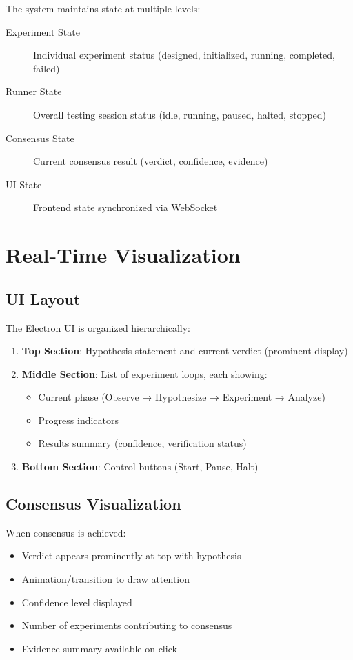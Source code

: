 \documentclass{book}
\begin{document}
The system maintains state at multiple levels:

\begin{description}
    \item[Experiment State] Individual experiment status (designed, initialized, running, completed, failed)
    \item[Runner State] Overall testing session status (idle, running, paused, halted, stopped)
    \item[Consensus State] Current consensus result (verdict, confidence, evidence)
    \item[UI State] Frontend state synchronized via WebSocket
\end{description}

\chapter{Real-Time Visualization}

\section{UI Layout}

The Electron UI is organized hierarchically:

\begin{enumerate}
    \item \textbf{Top Section}: Hypothesis statement and current verdict (prominent display)
    \item \textbf{Middle Section}: List of experiment loops, each showing:
    \begin{itemize}
        \item Current phase (Observe → Hypothesize → Experiment → Analyze)
        \item Progress indicators
        \item Results summary (confidence, verification status)
    \end{itemize}
    \item \textbf{Bottom Section}: Control buttons (Start, Pause, Halt)
\end{enumerate}

\section{Consensus Visualization}

When consensus is achieved:

\begin{itemize}
    \item Verdict appears prominently at top with hypothesis
    \item Animation/transition to draw attention
    \item Confidence level displayed
    \item Number of experiments contributing to consensus
    \item Evidence summary available on click
\end{itemize}
\end{document}
